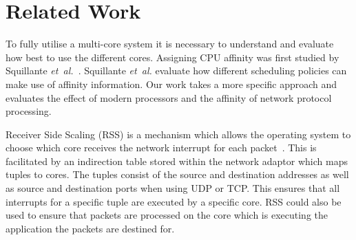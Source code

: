 \documentclass[conference, compsoc]{IEEEtran}
\begin{document}
\section{Related Work}
\label{sect:RelatedWork}



%
%

To fully utilise a multi-core system it is necessary to understand and evaluate how best to use the different cores. Assigning CPU affinity was first studied by Squillante \textit{et~al.}~\cite{629143}. Squillante \textit{et~al.} evaluate how different scheduling policies can make use of affinity information. Our work takes a more specific approach and evaluates the effect of modern processors and the affinity of network protocol processing.

Receiver Side Scaling (RSS) is a mechanism which allows the operating system to choose which core receives the network interrupt for each packet~\cite{RSS}. This is facilitated by an indirection table stored within the network adaptor which maps tuples to cores. The tuples consist of the source and destination addresses  as well as source and destination ports when using UDP or TCP. This ensures that all interrupts for a specific tuple are executed by a specific core. RSS could also be used to ensure that packets are processed on the core which is executing the application the packets are destined for.
\end{document}
